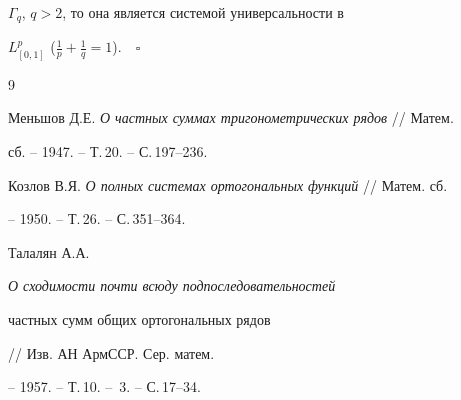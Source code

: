 $\Gamma_q$, $q>2$, то она является системой универсальности в 


$L^p_{[0,1]}$ ($\frac{1}{p}+\frac{1}{q}=1$).$\quad\square$ 


 


 


\begin{thebibliography}{9} 


 




Меньшов Д.Е. {\em О частных суммах тригонометрических рядов} // Матем. 


сб. -- 1947. -- Т.\,20. -- С.\,197--236. 




Козлов В.Я. {\em О полных системах ортогональных функций} // Матем. сб. 


-- 1950. -- Т.\,26. -- С.\,351--364. 




Талалян А.А. {\em О сходимости почти всюду подпоследовательностей 


частных сумм общих ортогональных рядов} // Изв. АН АрмССР. Сер. матем. 


-- 1957. -- Т.\,10. -- \No\,3. -- С.\,17--34. 


 


 


\end{thebibliography} 


 


\vskip 2cm 


 






 


\label{end} 


 


 


